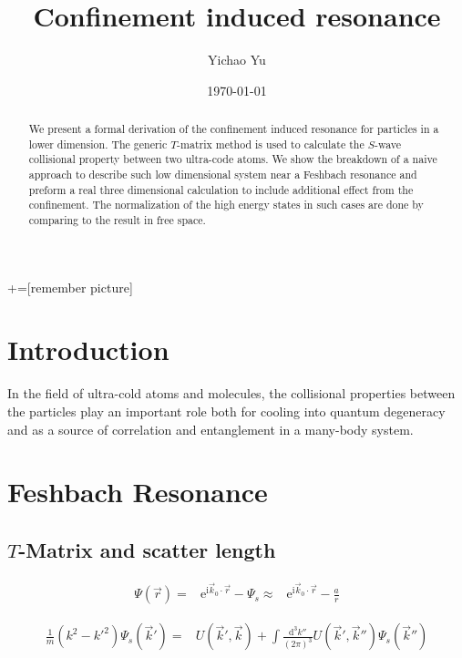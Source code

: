 \documentclass[aps,twocolumn,secnumarabic,balancelastpage,amsmath,amssymb,nofootinbib]{revtex4}
\newcommand{\ud}{\mathrm{d}}
\newcommand{\ue}{\mathrm{e}}
\newcommand{\ui}{\mathrm{i}}
\newcommand{\eqar}[1]
{
  \begin{align*}
    #1
  \end{align*}
}
\newcommand{\paren}[1]{{\left({#1}\right)}}
\begin{document}
+=[remember picture]
\title{Confinement induced resonance}
\author{Yichao Yu}
\date{\today}

\begin{abstract}
  We present a formal derivation of the confinement induced resonance for particles in a lower dimension. The generic $T$-matrix method is used to calculate the $S$-wave collisional property between two ultra-code atoms. We show the breakdown of a naive approach to describe such low dimensional system near a Feshbach resonance and preform a real three dimensional calculation to include additional effect from the confinement. The normalization of the high energy states in such cases are done by comparing to the result in free space.
\end{abstract}

\maketitle
\section{Introduction}
In the field of ultra-cold atoms and molecules, the collisional properties between the particles play an important role both for cooling into quantum degeneracy and as a source of correlation and entanglement in a many-body system.
\section{Feshbach Resonance}
\subsection{$T$-Matrix and scatter length}

\eqar{
  \Psi\paren{\vec r}=&\ue^{\ui \vec k_0\cdot \vec r}-\Psi_{s}
  \approx&\ue^{\ui \vec k_0\cdot \vec r}-\frac{a}{r}
}

\eqar{
  \frac1{m}\paren{k^2-k'^2}\Psi_{s}\paren{\vec k'}=&U\paren{\vec k', \vec k}+\int\frac{\ud^3 k''}{\paren{2\pi}^3}U\paren{\vec k', \vec k''}\Psi_s\paren{\vec k''}
}
\end{document}

